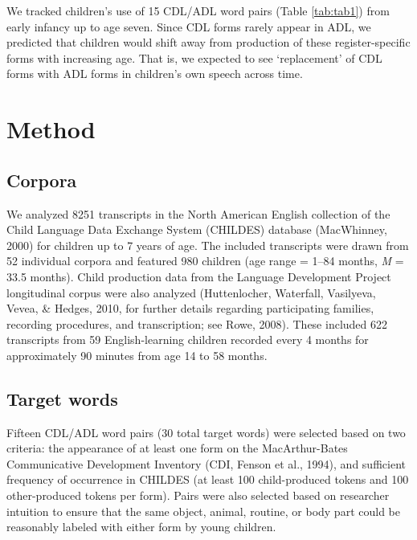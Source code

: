 \documentclass[10pt, letterpaper]{article}
\begin{document}
We tracked children's use of 15 CDL/ADL word pairs (Table
\ref{tab:tab1}) from early infancy up to age seven. Since CDL forms
rarely appear in ADL, we predicted that children would shift away from
production of these register-specific forms with increasing age. That
is, we expected to see `replacement' of CDL forms with ADL forms in
children's own speech across time.

\hypertarget{method}{%
\section{Method}\label{method}}

\hypertarget{corpora}{%
\subsection{Corpora}\label{corpora}}

We analyzed 8251 transcripts in the North American English collection of
the Child Language Data Exchange System (CHILDES) database (MacWhinney,
2000) for children up to 7 years of age. The included transcripts were
drawn from 52 individual corpora and featured 980 children (age range =
1--84 months, \emph{M} = 33.5 months). Child production data from the
Language Development Project longitudinal corpus were also analyzed
(Huttenlocher, Waterfall, Vasilyeva, Vevea, \& Hedges, 2010, for further
details regarding participating families, recording procedures, and
transcription; see Rowe, 2008). These included 622 transcripts from 59
English-learning children recorded every 4 months for approximately 90
minutes from age 14 to 58 months.

\hypertarget{target-words}{%
\subsection{Target words}\label{target-words}}

Fifteen CDL/ADL word pairs (30 total target words) were selected based
on two criteria: the appearance of at least one form on the
MacArthur-Bates Communicative Development Inventory (CDI, Fenson et al.,
1994), and sufficient frequency of occurrence in CHILDES (at least 100
child-produced tokens and 100 other-produced tokens per form). Pairs
were also selected based on researcher intuition to ensure that the same
object, animal, routine, or body part could be reasonably labeled with
either form by young children.
\end{document}
